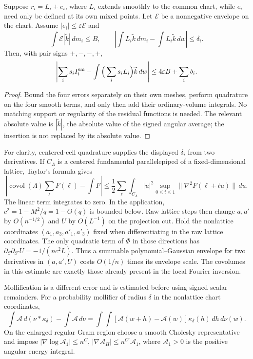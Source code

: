 \begin{lemma}\label{prof:mixed-coordinate-transfer}
Suppose $r_i=L_i+e_i$, where $L_i$ extends smoothly to the common
chart, while $e_i$ need only be defined at its own mixed points.
Let $\mathscr E$ be a nonnegative envelope on the chart.
Assume $|e_i|\le\varepsilon\mathscr E$ and
\[
 \int\mathscr E|\widetilde k|\,dm_i\le B,\qquad
 \left|\int L_i\widetilde k\,dm_i
             -\int L_i\widetilde k\,dw\right|\le\delta_i.
\]
Then, with pair signs $+,-,-,+$,
\[
 \left|\sum_i s_iI_i^{\rm sm}
       -\int\Big(\sum_i s_iL_i\Big)\widetilde k\,dw\right|
 \le4\varepsilon B+\sum_i\delta_i.
\]
\end{lemma}
\begin{proof}
Bound the four errors separately on their own meshes, perform
quadrature on the four smooth terms, and only then add their
ordinary-volume integrals. No matching support or regularity of
the residual functions is needed. The relevant absolute value is
$|\widetilde k|$, the absolute value of the signed angular
average; the insertion is not replaced by its absolute value.
\end{proof}

For clarity, centered-cell quadrature supplies the displayed
$\delta_i$ from two derivatives. If $C_\Lambda$ is a centered
fundamental parallelepiped of a fixed-dimensional lattice, Taylor's
formula gives
\[
 \left|\operatorname{covol}(\Lambda)\sum_{\ell}F(\ell)
                   -\int F\right|
 \le\frac12\sum_{\ell}\int_{C_\Lambda}|u|^2
       \sup_{0\le t\le1}\|\nabla^2F(\ell+tu)\|\,du.
\]
The linear term integrates to zero. In the application,
$c^2=1-M^2/q=1-O(q)$ is bounded below. Raw lattice steps then
change $a,a'$ by $O(n^{-1/2})$ and $U$ by $O(L^{-1})$ on the
projection cut. Hold the nonlattice coordinates
$(a_1,a_3,a'_1,a'_3)$ fixed when differentiating in the raw
lattice coordinates. The only quadratic term of $\Phi$ in those
directions has
$\partial_S\partial_{S'}U=-1/(nc^2L)$.
Thus a summable polynomial--Gaussian
envelope for two derivatives in $(a,a',U)$ costs $O(1/n)$ times
its envelope scale. The covolumes in this estimate are exactly
those already present in the local Fourier inversion.

Mollification is a different error and is estimated before using
signed scalar remainders. For a probability mollifier of radius
$\delta$ in the nonlattice chart coordinates,
\[
 \int\mathcal A\,d(\nu*\kappa_\delta)-\int\mathcal A\,d\nu
 =\int\!\int[\mathcal A(w+h)-\mathcal A(w)]
                         \kappa_\delta(h)\,dh\,d\nu(w).
\]
On the enlarged regular Gram region choose a smooth Cholesky
representative and impose
$|\nabla\log\mathcal A_1|\le n^C$,
$|\nabla\mathcal A_H|\le n^{C'}\mathcal A_1$, where
$\mathcal A_1>0$ is the positive angular energy integral.

